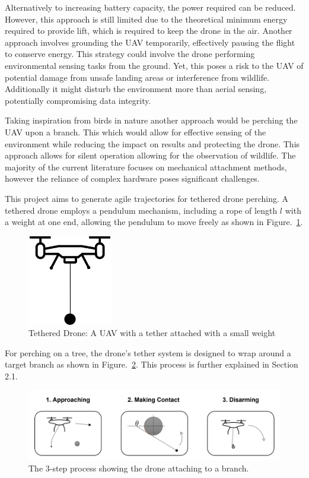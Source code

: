 Alternatively to increasing battery capacity, the power required can be reduced.
However, this approach is still limited due to the theoretical minimum energy required to provide lift, which is required to keep the drone in the air.
Another approach involves grounding the UAV temporarily, effectively pausing the flight to conserve energy.
This strategy could involve the drone performing environmental sensing tasks from the ground.
Yet, this poses a risk to the UAV of potential damage from unsafe landing areas or interference from wildlife.
Additionally it might disturb the environment more than aerial sensing, potentially compromising data integrity.

Taking inspiration from birds in nature another approach would be perching the UAV upon a branch.
This which would allow for effective sensing of the environment while reducing the impact on results and protecting the drone.
This approach allows for silent operation allowing for the observation of wildlife.
The majority of the current literature focuses on mechanical attachment methods, however the reliance of complex hardware poses significant challenges.

This project aims to generate agile trajectories for tethered drone perching.
A tethered drone employs a pendulum mechanism, including a rope of length $l$ with a weight at one end, allowing the pendulum to move freely as shown in Figure.~\ref*{fig:intro-tethered-drone}.

\begin{figure}[htbp]
  \centering
  \includegraphics[width=0.33\textwidth]{introduction/TetheredDrone.drawio.png}
  \caption{Tethered Drone: A UAV with a tether attached with a small weight}
\label{fig:intro-tethered-drone}
\end{figure}

For perching on a tree, the drone's tether system is designed to wrap around a target branch as shown in Figure.~\ref{fig:intro-wrapping}.
This process is further explained in Section 2.1.

\begin{figure}[htbp]
  \centering
  \includegraphics[width=\textwidth]{introduction/dronePerching.png}
  \caption{The 3-step process showing the drone attaching to a branch.}
\label{fig:intro-wrapping}
\end{figure}

